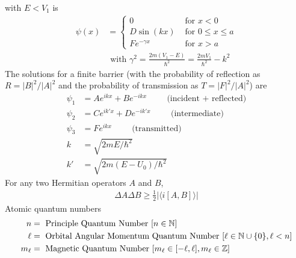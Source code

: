with $E<V_1$ is
\begin{align}
	\psi(x) &=
	\begin{cases}
		0 & \textrm{ for } x<0 \\
		D\sin(kx) & \textrm{ for } 0 \leq x \leq a \\
		Fe^{-\gamma x} & \textrm{ for } x>a
	\end{cases} \\
	& \textrm{ with } \gamma^2=\frac{2m(V_1-E)}{\hbar^2}=\frac{2mV_1}{\hbar^2}-k^2
\end{align}
The solutions for a finite barrier (with the probability of reflection as $R=|B|^2/|A|^2$ and the probability of transmission as $T=|F|^2/|A|^2$) are
\begin{align}
	\psi_1&=Ae^{ikx}+Be^{-ikx} \hspace{1cm}\textrm{(incident + reflected)} \\
	\psi_2&=Ce^{ik'x}+De^{-ik'x} \hspace{1cm}\textrm{(intermediate)}\\
	\psi_3&=Fe^{ikx} \hspace{1cm}\textrm{(transmitted)} \\
	k&=\sqrt{2mE/\hbar^2}\\
	k'&=\sqrt{2m(E-U_0)/\hbar^2}
\end{align}
For any two Hermitian operators $A$ and $B$,
\begin{align}
	\Delta A \Delta B \geq \frac{1}{2}| \langle i [A, B] \rangle |
\end{align}
Atomic quantum numbers
\begin{align}
	n &= \textrm{ Principle Quantum Number } [n \in \mathbb{N}]\\
	\ell &= \textrm{ Orbital Angular Momentum Quantum Number } [\ell \in \mathbb{N}\cup\{0\}, \ell < n] \\
	m_\ell &= \textrm{ Magnetic Quantum Number }[m_\ell \in [-\ell, \ell], m_\ell \in \mathbb{Z}]
\end{align}

